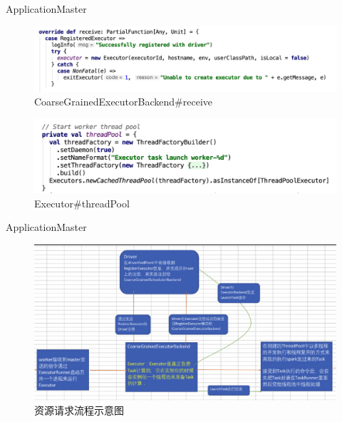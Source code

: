 \begin{frame}[plain,t]{ApplicationMaster} %
	 \\  
	\begin{figure}
		\centering
		\includegraphics[width=0.9\linewidth]{images/app012}
		\caption{CoarseGrainedExecutorBackend\#receive}
		\label{fig:app012}
	\end{figure}
	\begin{figure}
		\centering
		\includegraphics[width=0.9\linewidth]{images/app013}
		\caption{Executor\#threadPool}
		\label{fig:app013}
	\end{figure}
	
\end{frame}

\begin{frame}[plain,t]{ApplicationMaster} %
	 \\  \vspace{2ex}
	\begin{figure}
		\centering
		\includegraphics[width=0.9\linewidth]{images/init001}
		\caption{资源请求流程示意图}
		\label{fig:init001}
	\end{figure}
	
\end{frame}
